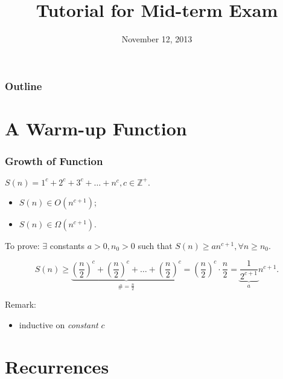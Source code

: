 \documentclass{beamer}
\title{Tutorial for Mid-term Exam}
\date{November 12, 2013}
\begin{document}
\begin{frame}
	\titlepage
\end{frame}

\begin{frame}
	\frametitle{Outline}
	\tableofcontents
\end{frame}

\section{A Warm-up Function}

\begin{frame}
  \frametitle{Growth of Function}
  
  \begin{Problem} 
    $S(n) = 1^c + 2^c + 3^c + \ldots + n^c, c \in \mathbb{Z^{+}}.$
    \begin{itemize}
      \item $S(n) \in O(n^{c+1})$;
      \item $S(n) \in \Omega(n^{c+1})$.
    \end{itemize}
  \end{Problem}
  
  \vspace{0.30cm}
  To prove: $\exists$ constants $a > 0, n_0 > 0$ such that $S(n) \geq a
  n^{c+1}, \forall n \geq n_0$.
  
  \[
   S(n) \geq \underbrace{(\frac{n}{2})^{c} + (\frac{n}{2})^{c} + \ldots +
    (\frac{n}{2})^{c}}_{\# = \frac{n}{2}}
    = (\frac{n}{2})^{c} \cdot \frac{n}{2}
    = \underbrace{\frac{1}{2^{c+1}}}_{a}n^{c+1}.
  \]
  
  \begin{block}{Remark:}
    \begin{itemize}
      \item inductive on \emph{constant} $c$
    \end{itemize}
  \end{block}  
\end{frame}
\section{Recurrences}
\end{document}
